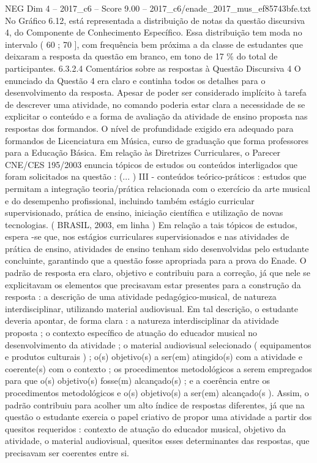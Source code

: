 \begin{textsample}{NEG Dim 4 – 2017\_c6 – Score 9.00 – 2017\_c6/enade\_2017\_mus\_ef85743bfe.txt}
No Gráfico 6.12, está representada a distribuição de notas da questão discursiva 4, do Componente de Conhecimento Específico.
Essa distribuição tem moda no intervalo ( 60 ; 70 ], com frequência bem próxima a da classe de estudantes que deixaram a resposta da questão em branco, em tono de 17 \% do total de participantes. 6.3.2.4 Comentários sobre as respostas à Questão Discursiva 4 O enunciado da Questão 4 era claro e continha todos os detalhes para o desenvolvimento da resposta.
Apesar de poder ser considerado implícito à tarefa de descrever uma atividade, no comando poderia estar clara a necessidade de se explicitar o conteúdo e a forma de avaliação da atividade de ensino proposta nas respostas dos formandos.
O nível de profundidade exigido era adequado para formandos de Licenciatura em Música, curso de graduação que forma professores para a Educação Básica.
Em relação às Diretrizes Curriculares, o Parecer CNE/CES 195/2003 enuncia tópicos de estudos ou conteúdos interligados que foram solicitados na questão : (... ) III - conteúdos teórico-práticos : estudos que permitam a integração teoria/prática relacionada com o exercício da arte musical e do desempenho profissional, incluindo também estágio curricular supervisionado, prática de ensino, iniciação científica e utilização de novas tecnologias. ( BRASIL, 2003, em linha ) Em relação a tais tópicos de estudos, espera -se que, nos estágios curriculares supervisionados e nas atividades de prática de ensino, atividades de ensino tenham sido desenvolvidas pelo estudante concluinte, garantindo que a questão fosse apropriada para a prova do Enade.
O padrão de resposta era claro, objetivo e contribuiu para a correção, já que nele se explicitavam os elementos que precisavam estar presentes para a construção da resposta : a descrição de uma atividade pedagógico-musical, de natureza interdisciplinar, utilizando material audiovisual.
Em tal descrição, o estudante deveria apontar, de forma clara : a natureza interdisciplinar da atividade proposta ; o contexto específico de atuação do educador musical no desenvolvimento da atividade ; o material audiovisual selecionado ( equipamentos e produtos culturais ) ; o(s) objetivo(s) a ser(em) atingido(s) com a atividade e coerente(s) com o contexto ; os procedimentos metodológicos a serem empregados para que o(s) objetivo(s) fosse(m) alcançado(s) ; e a coerência entre os procedimentos metodológicos e o(s) objetivo(s) a ser(em) alcançado(s ).
Assim, o padrão contribuiu para acolher um alto índice de respostas diferentes, já que na questão o estudante exercia o papel criativo de propor uma atividade a partir dos quesitos requeridos : contexto de atuação do educador musical, objetivo da atividade, o material audiovisual, quesitos esses determinantes das respostas, que precisavam ser coerentes entre si.

\end{textsample}
